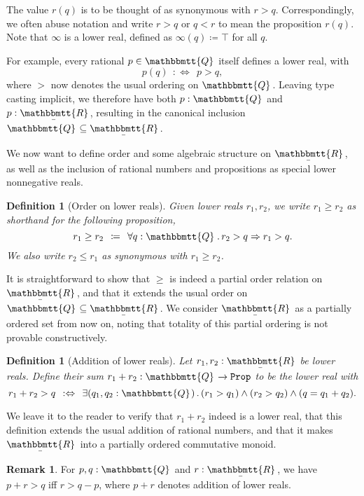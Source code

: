 \documentclass[reqno,11pt]{amsproc}
\theoremstyle{plain}
\newtheorem{definition}[theorem]{Definition}
\theoremstyle{definition}
\newtheorem{remark}[theorem]{Remark}
\newcommand{\Const}[1]{\mathtt{#1}}
\renewcommand{\to}[1][]{\xrightarrow{#1}}
\newcommand{\ubar}[1]{\underaccent{\bar}{#1}}
\newcommand{\internal}[1]{\raisebox{-.03ex}{$\mathbbmtt{#1}$}}
\newcommand{\hs}{\hspace{1pt}}
\newcommand{\tqq}{\internal{Q}\hs}
\newcommand{\trr}{\internal{R}}
\newcommand{\tlrr}{\ubar{\trr}\hs}
\newcommand{\prop}{\Const{Prop}}
\newcommand{\imp}{\Rightarrow}
\renewcommand{\iff}{\Leftrightarrow}
\numberwithin{equation}{section}
\begin{document}
The value $r(q)$ is to be thought of as synonymous with $r > q$.
Correspondingly, we often abuse notation and write $r > q$ or $q < r$ to mean the proposition $r(q)$. Note that $\infty$ is a lower real, defined as $\infty(q) \coloneqq \top$ for all $q$.

For example, every rational $p \in \tqq$ itself defines a lower real, with
\[
	p(q) \:\::\iff\:\: p > q,
\]
where $>$ now denotes the usual ordering on $\tqq$. Leaving type casting implicit, we therefore have both $p : \tqq$ and $p : \tlrr$, resulting in the canonical inclusion $\tqq \subseteq \tlrr$.

We now want to define order and some algebraic structure on $\tlrr$, as well as the inclusion of rational numbers and propositions as special lower nonnegative reals.

\begin{definition}[Order on lower reals]
Given lower reals $r_1,r_2$,
we write $r_1 \ge r_2$ as shorthand for the following proposition,
\begin{equation}\label{eqn.real_order}
	r_1 \ge r_2 \:\:\coloneqq\:\: \forall q:\tqq \, . \, r_2 > q \imp r_1 > q.
\end{equation}
We also write $r_2 \le r_1$ as synonymous with $r_1 \ge r_2$.
\end{definition}

It is straightforward to show that $\ge$ is indeed a partial order relation on $\tlrr$, and that it extends the usual order on $\tqq \subseteq \tlrr$. We consider $\tlrr$ as a partially ordered set from now on, noting that totality of this partial ordering is not provable constructively.

\begin{definition}[Addition of lower reals]\label{def.sum_lr}
Let $r_1,r_2:\tlrr$ be lower reals. Define their \emph{sum} $r_1 + r_2 : \tqq\to\prop$ to be the lower real with
\begin{equation}\label{eqn.sum_lr}
r_1+r_2 > q \:\::\iff\:\: \exists (q_1,q_2:\tqq) \,.\, (r_1>q_1)\wedge (r_2> q_2)\wedge (q=q_1+q_2).
\end{equation}
\end{definition}

We leave it to the reader to verify that $r_1 + r_2$ indeed is a lower real, that this definition extends the usual addition of rational numbers, and that it makes $\tlrr$ into a partially ordered commutative monoid.

\begin{remark}
	\label{rational_ineq_move}
	For $p,q : \tqq$ and $r : \tlrr$, we have $p + r > q$ iff $r > q - p$, where $p + r$ denotes addition of lower reals.
\end{remark}
\end{document}
